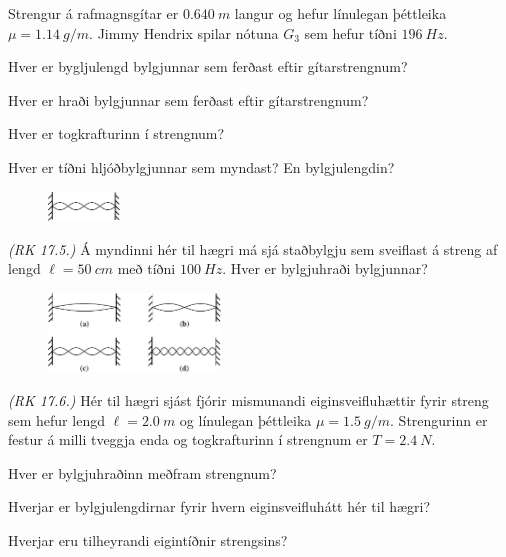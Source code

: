 \ifdefined \wholebook \else\documentclass[oneside]{book}\usepackage{EdlBook}\graphicspath{{figures/}}
\begin{document}
\begin{enumerate}[label = \textbf{Dæmi \thechapter.\arabic*.}]
\setcounter{enumi}{28}

\item Strengur á rafmagnsgítar er $\SI{0.640}{m}$ langur og hefur línulegan þéttleika $\mu = \SI{1.14}{g/m}$. Jimmy Hendrix spilar nótuna $G_3$ sem hefur tíðni $\SI{196}{Hz}$. \begin{enumerate*}[label = \textbf{(\alph*)}]
    \item Hver er bygljulengd bylgjunnar sem ferðast eftir gítarstrengnum?
    \item Hver er hraði bylgjunnar sem ferðast eftir gítarstrengnum?
    \item Hver er togkrafturinn í strengnum?
    \item Hver er tíðni hljóðbylgjunnar sem myndast? En bylgjulengdin?
\end{enumerate*}

\begin{minipage}{\linewidth}

\begin{figure}
\vspace{-0.75cm}
\includegraphics[width = 0.75in]{figures/stadbylgjanmin.pdf}
\end{figure}

\item \textit{(RK 17.5.)} Á myndinni hér til hægri má sjá staðbylgju sem sveiflast á streng af lengd $\ell = \SI{50}{cm}$ með tíðni $\SI{100}{Hz}$. Hver er bylgjuhraði bylgjunnar?

\end{minipage}


\begin{minipage}{\linewidth}

\begin{figure}
\vspace{-0.5cm}
\includegraphics[width = 1.8in]{figures/standbert.pdf}
\end{figure}

\item \textit{(RK 17.6.)} Hér til hægri sjást fjórir mismunandi eiginsveifluhættir fyrir streng sem hefur lengd $\ell = \SI{2.0}{m}$ og línulegan þéttleika $\mu = \SI{1.5}{g/m}$. Strengurinn er festur á milli tveggja enda og togkrafturinn í strengnum er $T = \SI{2.4}{N}$. \begin{enumerate*}[label = \textbf{(\alph*)}]
    \item Hver er bylgjuhraðinn meðfram strengnum?
    \item Hverjar er bylgjulengdirnar fyrir hvern eiginsveifluhátt hér til hægri?
    \item Hverjar eru tilheyrandi eigintíðnir strengsins?
\end{enumerate*}


\end{minipage}
\end{enumerate}
\end{document}
